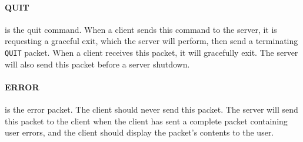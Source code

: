 \documentclass{article}
\begin{document}
\paragraph{QUIT} is the quit command. When a client sends this command to the server, it is requesting a graceful exit, which the server will perform, then send a terminating \verb|QUIT| packet. When a client receives this packet, it will gracefully exit. The server will also send this packet before a server shutdown.

\paragraph{ERROR} is the error packet. The client should never send this packet. The server will send this packet to the client when the client has sent a complete packet containing user errors, and the client should display the packet's contents to the user.
\end{document}

